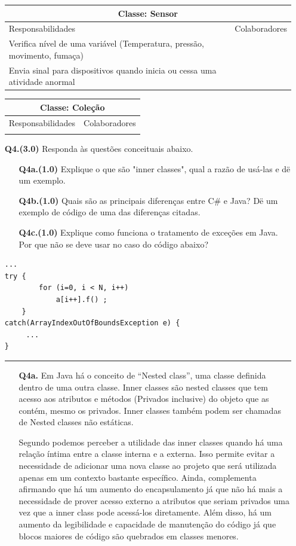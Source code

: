 \documentclass[11pt]{article}
\begin{document}
\begin{itemize}
\begin{tabularx}{\textwidth}{|X|X|}
  \hline
  \multicolumn{2}{|c|}{Classe: Sensor} \\
  \hline
  Responsabilidades & Colaboradores \\ \hline
  Verifica nível de uma variável (Temperatura, pressão, movimento, fumaça) &  \\
  Envia sinal para dispositivos quando inicia ou cessa uma atividade anormal  & \\
  \hline
\end{tabularx}

\begin{tabularx}{\textwidth}{|X|X|}
  \hline
  \multicolumn{2}{|c|}{Classe: Coleção} \\
  \hline
  Responsabilidades & Colaboradores \\ \hline & \\ \hline
\end{tabularx}

\newpage
\item[{\bf Q4.(3.0)}] Responda às questões conceituais abaixo. 
\begin{itemize}
\item[{\bf Q4a.(1.0)}] Explique o que são "inner classes", qual a razão de usá-las e dë um exemplo.
\item[{\bf Q4b.(1.0)}] Quais são as principais diferenças entre C\# e Java? Dë um exemplo de código 
de uma das diferenças citadas.  
\item[{\bf Q4c.(1.0)}] Explique como funciona o tratamento de exceções em Java. Por que não se deve 
usar no caso do código abaixo?
\end{itemize}
\begin{verbatim}
...
try {
        for (i=0, i < N, i++) 
            a[i++].f() ;
    } 
catch(ArrayIndexOutOfBoundsException e) {
     ...
}
\end{verbatim}

\hrule
\begin{itemize}
  \item[{\bf Q4a.}] 
  Em Java há o conceito de ``Nested class'', uma classe definida dentro de uma
  outra classe. Inner classes são nested classes que tem acesso aos
  atributos e métodos (Privados inclusive) do objeto que as contém, mesmo os
  privados. Inner classes também podem ser chamadas de Nested classes não
  estáticas. \cite{oracle:nested-classes}
  
  Segundo \cite{carlos:classes-internas} podemos perceber a utilidade das inner
  classes quando há uma relação íntima entre a classe interna e a externa. Isso
  permite evitar a necessidade de adicionar uma nova classe ao projeto que será
  utilizada apenas em um contexto bastante específico. Ainda, 
  \cite{oracle:nested-classes} complementa afirmando que há um aumento do
  encapsulamento já que não há mais a necessidade de prover acesso externo a
  atributos que seriam privados uma vez que a inner class pode acessá-los
  diretamente. Além disso, há um aumento da legibilidade e capacidade de
  manutenção do código já que blocos maiores de código são quebrados em classes
  menores.
  

\end{itemize}
\end{itemize}
\end{document}
